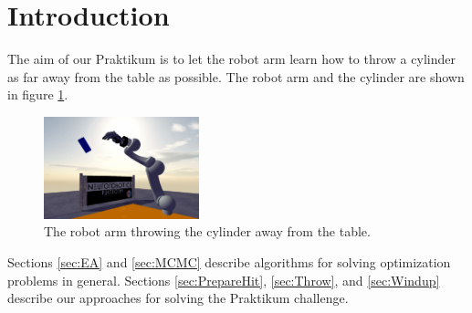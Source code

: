 \section{Introduction}

The aim of our Praktikum is to let the robot arm learn how to throw a cylinder as far away from the table as possible. The robot arm and the cylinder are shown in figure \ref{fig:challenge}.

\begin{figure}
	\begin{center}
		\includegraphics[width=0.4\textwidth]{hbpprak_2018}
	\end{center}
	\caption{The robot arm throwing the cylinder away from the table.}
	\label{fig:challenge}
\end{figure}

Sections \ref{sec:EA} and \ref{sec:MCMC} describe algorithms for solving optimization problems in general. Sections \ref{sec:PrepareHit}, \ref{sec:Throw}, and \ref{sec:Windup} describe our approaches for solving the Praktikum challenge.